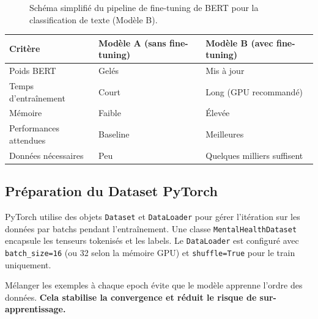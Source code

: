 \documentclass[12pt,a4paper]{report}
\begin{document}
\begin{figure}[H]
\begin{center}
\caption{\centering\small Schéma simplifié du pipeline de fine-tuning de BERT
  pour la classification de texte (Modèle B).}
\end{center}
\end{figure}

\begin{center}
\begin{tabular}{@{}lll@{}}
  \toprule
  Critère & Modèle A (sans fine-tuning) & Modèle B (avec fine-tuning) \\
  \midrule
  Poids BERT & Gelés & Mis à jour \\
  Temps d'entraînement & Court & Long (GPU recommandé) \\
  Mémoire & Faible & Élevée \\
  Performances attendues & Baseline & Meilleures \\
  Données nécessaires & Peu & Quelques milliers suffisent \\
  \bottomrule
\end{tabular}
\end{center}

\subsection{Préparation du Dataset PyTorch}

PyTorch utilise des objets \texttt{Dataset} et \texttt{DataLoader} pour gérer l'itération
sur les données par batchs pendant l'entraînement. Une classe \texttt{MentalHealthDataset}
encapsule les tenseurs tokenisés et les labels. Le \texttt{DataLoader} est configuré avec
\texttt{batch\_size=16} (ou 32 selon la mémoire GPU) et \texttt{shuffle=True} pour le
train uniquement.

\begin{tip}[Pourquoi mélanger (\texttt{shuffle=True}) ?]
Mélanger les exemples à chaque epoch évite que le modèle apprenne l'ordre des données.
\textbf{Cela stabilise la convergence et réduit le risque de sur-apprentissage.}
\end{tip}
\end{document}
